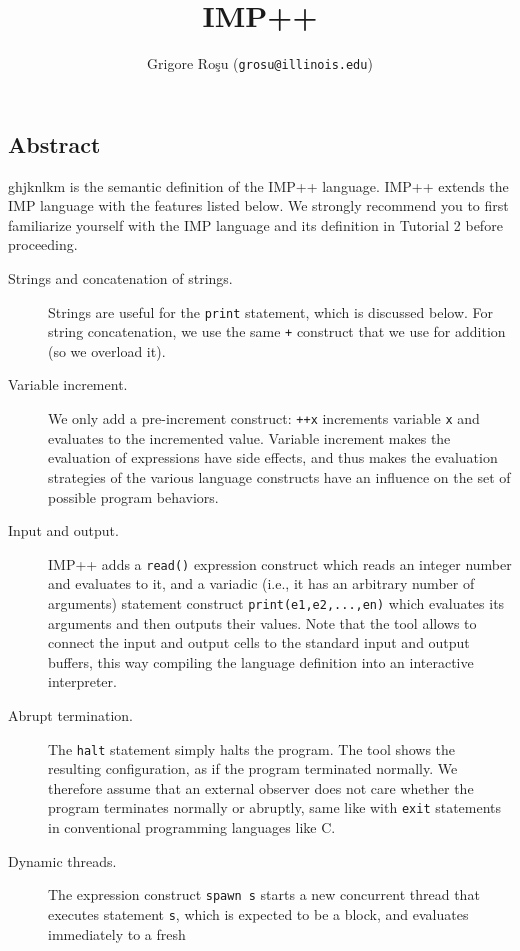 \documentclass{article}
\title{IMP++}
\author{Grigore Ro\c{s}u (\texttt{grosu@illinois.edu})}
\begin{document}
\begin{kdefinition}
\maketitle
\begin{kblock}[text]
 \section{Abstract}
ghjknlkm is the \K semantic definition of the IMP++ language.
IMP++ extends the IMP language with the features listed below.  We
strongly recommend you to first familiarize yourself with the IMP
language and its \K definition in Tutorial 2 before proceeding.
\begin{description}
\item [Strings and concatenation of strings.]  Strings are useful
for the \texttt{print} statement, which is discussed below.  For
string concatenation, we use the same \texttt{+} construct that we use
for addition (so we overload it).
\item [Variable increment.]  We only add a pre-increment construct:
\texttt{++x} increments variable \texttt{x} and evaluates to the
incremented value.  Variable increment makes the evaluation of
expressions have side effects, and thus makes the evaluation strategies
of the various language constructs have an influence on the set
of possible program behaviors.
\item [Input and output.]  IMP++ adds a \texttt{read()} expression
construct which reads an integer number and evaluates to it, and 
a variadic (i.e., it has an arbitrary number of arguments) statement
construct \texttt{print(e1,e2,...,en)} which evaluates its arguments
and then outputs their values.  Note that the \K tool allows to
connect the input and output cells to the standard input and output
buffers, this way compiling the language definition into an
interactive interpreter.
\item [Abrupt termination.]  The \texttt{halt} statement simply halts
the program.  The \K tool shows the resulting configuration, as if the
program terminated normally.  We therefore assume that an external
observer does not care whether the program terminates normally or
abruptly, same like with \texttt{exit} statements in conventional
programming languages like C\@.
\item [Dynamic threads.] The expression construct \texttt{spawn s}
starts a new concurrent thread that executes statement \texttt{s},
which is expected to be a block, and evaluates immediately to a fresh

\end{description}
\end{kblock}
\end{kdefinition}
\end{document}
